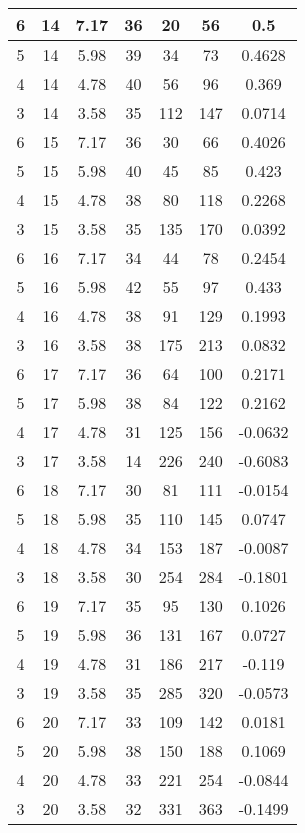 \documentclass[letterpaper, 12pt]{article}
\begin{document}
\begin{longtable}{|c|c|c|c|c|c|c|}
\hline
6 & 14 & 7.17 & 36 & 20 & 56 & 0.5 \\
\hline
5 & 14 & 5.98 & 39 & 34 & 73 & 0.4628 \\
\hline
4 & 14 & 4.78 & 40 & 56 & 96 & 0.369 \\
\hline
3 & 14 & 3.58 & 35 & 112 & 147 & 0.0714 \\
\hline
6 & 15 & 7.17 & 36 & 30 & 66 & 0.4026 \\
\hline
5 & 15 & 5.98 & 40 & 45 & 85 & 0.423 \\
\hline
4 & 15 & 4.78 & 38 & 80 & 118 & 0.2268 \\
\hline
3 & 15 & 3.58 & 35 & 135 & 170 & 0.0392 \\
\hline
6 & 16 & 7.17 & 34 & 44 & 78 & 0.2454 \\
\hline
5 & 16 & 5.98 & 42 & 55 & 97 & 0.433 \\
\hline
4 & 16 & 4.78 & 38 & 91 & 129 & 0.1993 \\
\hline
3 & 16 & 3.58 & 38 & 175 & 213 & 0.0832 \\
\hline
6 & 17 & 7.17 & 36 & 64 & 100 & 0.2171 \\
\hline
5 & 17 & 5.98 & 38 & 84 & 122 & 0.2162 \\
\hline
4 & 17 & 4.78 & 31 & 125 & 156 & -0.0632 \\
\hline
3 & 17 & 3.58 & 14 & 226 & 240 & -0.6083 \\
\hline
6 & 18 & 7.17 & 30 & 81 & 111 & -0.0154 \\
\hline
5 & 18 & 5.98 & 35 & 110 & 145 & 0.0747 \\
\hline
4 & 18 & 4.78 & 34 & 153 & 187 & -0.0087 \\
\hline
3 & 18 & 3.58 & 30 & 254 & 284 & -0.1801 \\
\hline
6 & 19 & 7.17 & 35 & 95 & 130 & 0.1026 \\
\hline
5 & 19 & 5.98 & 36 & 131 & 167 & 0.0727 \\
\hline
4 & 19 & 4.78 & 31 & 186 & 217 & -0.119 \\
\hline
3 & 19 & 3.58 & 35 & 285 & 320 & -0.0573 \\
\hline
6 & 20 & 7.17 & 33 & 109 & 142 & 0.0181 \\
\hline
5 & 20 & 5.98 & 38 & 150 & 188 & 0.1069 \\
\hline
4 & 20 & 4.78 & 33 & 221 & 254 & -0.0844 \\
\hline
3 & 20 & 3.58 & 32 & 331 & 363 & -0.1499 \\
\hline
\end{longtable}
\end{document}
